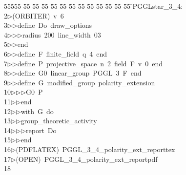 %
%
\begin{tabbing}
55555 \= 55 \= 55 \= 55 \= 55 \= 55 \= 55 \= 55 \= 55 \= 55 \= 55 \= 55 \= 55 \= \>PGGLstar\_3\_4:\\[0pt]
2\>$\triangleright$\>(ORBITER)\ v\ 6\ \\[0pt]
3\>$\triangleright$\>$\triangleright$\>define\ Do\ draw\_options\ \\[0pt]
4\>$\triangleright$\>$\triangleright$\>$\triangleright$\>radius\ 200\ line\_width\ 03\ \\[0pt]
5\>$\triangleright$\>$\triangleright$\>end\ \\[0pt]
6\>$\triangleright$\>$\triangleright$\>define\ F\ finite\_field\ q\ 4\ end\ \\[0pt]
7\>$\triangleright$\>$\triangleright$\>define\ P\ projective\_space\ n\ 2\ field\ F\ v\ 0\ end\ \\[0pt]
8\>$\triangleright$\>$\triangleright$\>define\ G0\ linear\_group\ PGGL\ 3\ F\ end\ \\[0pt]
9\>$\triangleright$\>$\triangleright$\>define\ G\ modified\_group\ polarity\_extension\ \\[0pt]
10\>$\triangleright$\>$\triangleright$\>$\triangleright$\>G0\ P\ \\[0pt]
11\>$\triangleright$\>$\triangleright$\>end\ \\[0pt]
12\>$\triangleright$\>$\triangleright$\>with\ G\ do\ \\[0pt]
13\>$\triangleright$\>$\triangleright$\>group\_theoretic\_activity\ \\[0pt]
14\>$\triangleright$\>$\triangleright$\>$\triangleright$\>report\ Do\ \\[0pt]
15\>$\triangleright$\>$\triangleright$\>end\\[0pt]
16\>$\triangleright$\>(PDFLATEX)\ PGGL\_3\_4\_polarity\_ext\_reporttex\\[0pt]
17\>$\triangleright$\>(OPEN)\ PGGL\_3\_4\_polarity\_ext\_reportpdf\\[0pt]
18\>\end{tabbing}
